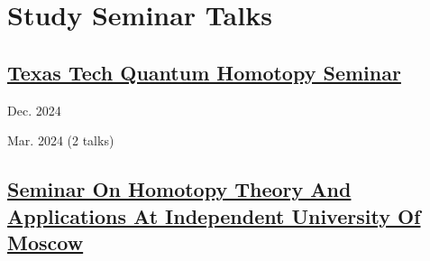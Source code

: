 \documentclass[11pt,letterpaper]{report}
\begin{document}
    
    
        
       
    
    
    
    
    \section*{Study Seminar Talks}
    
    \subsection*{\href{https://researchseminars.org/seminar/HomotopyTheoryAndApps}{Texas Tech Quantum Homotopy Seminar}}
    
    \begin{tablist}
    
    \item{Dec. 2024} 
    
     \item{Mar. 2024}  (2 talks)
     
     \end{tablist}
    
    \subsection*{\href{https://researchseminars.org/seminar/HomotopyTheoryAndApps}{Seminar On Homotopy Theory And Applications At Independent University Of Moscow}}
    
\end{document}

